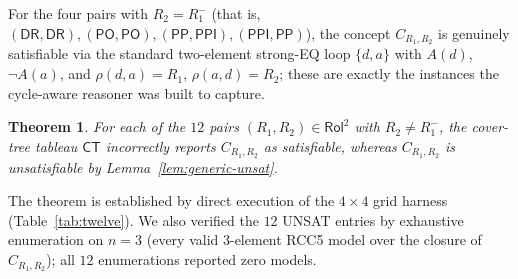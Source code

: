 \documentclass[]{ceurart}
\newcommand{\DR}{\mathsf{DR}}
\newcommand{\PO}{\mathsf{PO}}
\newcommand{\PP}{\mathsf{PP}}
\newcommand{\PPI}{\mathsf{PPI}}
\newcommand{\inv}[1]{#1^{-}}
\newtheorem{theorem}{Theorem}
\theoremstyle{definition}
\theoremstyle{remark}
\begin{document}
For the four pairs with $R_2 = \inv{R_1}$ (that is,
$(\DR, \DR), (\PO, \PO), (\PP, \PPI), (\PPI, \PP)$), the concept
$C_{R_1, R_2}$ is genuinely satisfiable via the standard two-element
strong-EQ loop $\{d, a\}$ with $A(d)$, $\neg A(a)$, and
$\rho(d, a) = R_1$, $\rho(a, d) = R_2$; these are exactly the
instances the cycle-aware reasoner was built to capture.

\begin{theorem}
  \label{thm:twelve}
  For each of the $12$ pairs $(R_1, R_2) \in \mathsf{Rol}^2$ with
  $R_2 \neq \inv{R_1}$, the cover-tree tableau $\mathsf{CT}$
  incorrectly reports $C_{R_1, R_2}$ as satisfiable, whereas
  $C_{R_1, R_2}$ is unsatisfiable by Lemma~\ref{lem:generic-unsat}.
\end{theorem}

The theorem is established by direct execution of the $4 \!\times\! 4$
grid harness (Table~\ref{tab:twelve}).  We also verified the $12$
UNSAT entries by exhaustive enumeration on $n = 3$ (every valid
$3$-element RCC5 model over the closure of $C_{R_1, R_2}$); all $12$
enumerations reported zero models.
\end{document}
